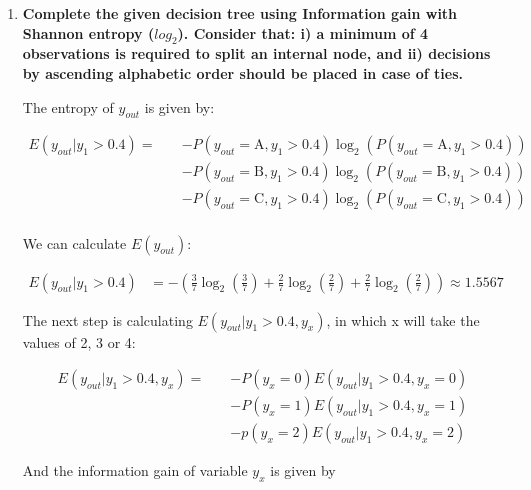 \documentclass[12pt]{article}
\begin{document}
\begin{enumerate}[leftmargin=\labelsep]
    \item \textbf{Complete the given decision tree using Information gain with Shannon entropy ($log_2$).
    Consider that: i) a minimum of 4 observations is required to split an internal node, and
    ii) decisions by ascending alphabetic order should be placed in case of ties.}

    \vskip 0.3cm
    The entropy of \(y_{out}\) is given by:

    \begin{equation}
        \begin{split}
            E(y_{out} |y_1 > 0.4) = \quad
            & - P(y_{out} = \text{A}, y_1 > 0.4) \log_2 \left(P(y_{out} = \text{A}, y_1 > 0.4)\right) \\
            & - P(y_{out} = \text{B}, y_1 > 0.4) \log_2 \left(P(y_{out} = \text{B}, y_1 > 0.4)\right)      \\
            & - P(y_{out} = \text{C}, y_1 > 0.4) \log_2 \left(P(y_{out} = \text{C}, y_1 > 0.4)\right)      \\
        \end{split}
    \end{equation}

    We can calculate $E(y_{out})$:

    \[
        \begin{aligned}
            E(y_{out} |y_1 > 0.4) & = - \left(\frac{3}{7} \log_2\left(\frac{3}{7}\right) + \frac{2}{7} \log_2\left(\frac{2}{7}\right)
                            + \frac{2}{7} \log_2\left(\frac{2}{7}\right)\right) \approx 1.5567
        \end{aligned}
    \]

    The next step is calculating $E(y_{out} | y_1 > 0.4 , y_x)$, in which x will take the values of 2, 3 or 4:

    \begin{equation}\label{exI1-e-yout-y2}
        \begin{split}
            E(y_{out} |y_1 > 0.4 , y_x) = \quad
            & - P(y_x = 0) E(y_{out} | y_1 > 0.4 , y_x = 0) \\
            & - P(y_x = 1) E(y_{out} | y_1 > 0.4 , y_x = 1) \\
            & - p(y_x = 2) E(y_{out} | y_1 > 0.4 , y_x = 2)
        \end{split}
    \end{equation}

    And the information gain of variable $y_x$ is given by


\end{enumerate}
\end{document}
